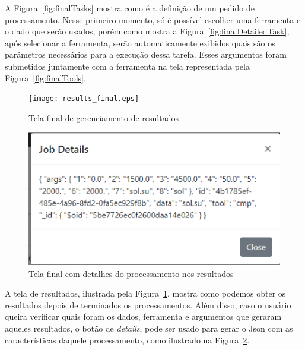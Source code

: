\documentclass[11pt,twoside]{article}
\begin{document}
A Figura~\ref{fig:finalTasks} mostra como é a definição de um pedido de processamento. Nesse primeiro momento, só é possível escolher uma ferramenta e o dado que serão usados, porém como mostra 
a Figura~\ref{fig:finalDetailedTask}, após selecionar a ferramenta, serão automaticamente exibidos quais são os parâmetros necessários para a execução dessa tarefa. Esses argumentos
foram submetidos juntamente com a ferramenta na tela representada pela Figura~\ref{fig:finalTools}.

\begin{figure}[!h]
  \centering
  \texttt{[image: results\_final.eps]}
  \caption{Tela final de gerenciamento de resultados}
  \label{fig:finalResults}
\end{figure}

\begin{figure}[!h]
  \centering
  \includegraphics[scale=0.6]{results_detail_final.eps}
  \caption{Tela final com detalhes do processamento nos resultados}
  \label{fig:finalResultsDetail}
\end{figure}

A tela de resultados, ilustrada pela Figura~\ref{fig:finalResults}, mostra como podemos obter os resultados depois de terminados os processamentos. Além disso, caso o usuário queira verificar 
quais foram os dados, ferramenta e argumentos que geraram aqueles resultados, o botão de \emph{details}, pode ser usado para gerar o Json com as características daquele processamento, como ilustrado na 
Figura~\ref{fig:finalResultsDetail}.
\end{document}
